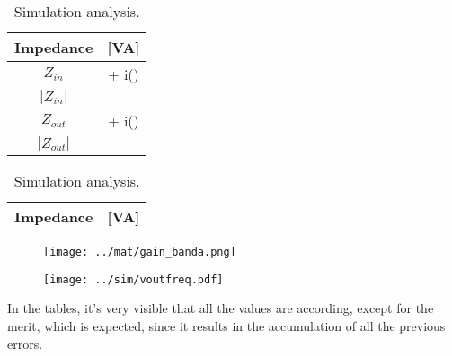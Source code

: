 \begin{table}[H]
    \begin{minipage}{.5\textwidth}
    \centering
    \vspace{3mm}
    \begin{table}[H]
    \centering
    \begin{tabular}{|c|c|}
    	\hline
        Impedance &  [VA]\\ 
        \hline
        $Z_{in}$ &  + i()\\ \hline
        $|Z_{in}|$ & \\ \hline
        $Z_{out}$ &  + i()\\ \hline
        $|Z_{out}|$ & \\ \hline
    \end{tabular}
	\end{table}
    \caption{Theoretical analysis.}
    \end{minipage}
    \begin{minipage}{.5\textwidth}
     \begin{table}[H]
    \centering 
    \begin{tabular}{|c|c|}
    	\hline
    	Impedance & [VA]\\ 
    	\hline
         
         
    \end{tabular}
	\end{table}
	\caption{Simulation analysis.} 
    \end{minipage}
\end{table}

\begin{table}[H]
    \begin{minipage}{.5\textwidth}
    \centering
    \begin{figure}[H]
    \centering
    \texttt{[image: ../mat/gain\_banda.png]}
	\end{figure}
    \caption{Theoretical analysis.}
    \end{minipage}
    \begin{minipage}{.5\textwidth}
	\begin{figure}[H]
    \centering
    \texttt{[image: ../sim/voutfreq.pdf]}
	\end{figure}
	\caption{Simulation analysis.} 
    \end{minipage}
\end{table}

In the tables, it's very visible that all the values are according, except for the merit, which is expected, since it results in the accumulation of all the previous errors.